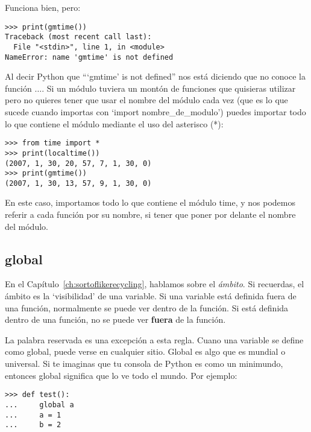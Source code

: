 \begin{listing}
\noindent
Funciona bien, pero:

\begin{listing}
\begin{verbatim}
>>> print(gmtime())
Traceback (most recent call last):
  File "<stdin>", line 1, in <module>
NameError: name 'gmtime' is not defined
\end{verbatim}
\end{listing}

Al decir Python que ```gmtime' is not defined'' nos está diciendo que no conoce la función $\ldots$. Si un módulo tuviera un montón de funciones que quisieras utilizar pero no quieres tener que usar el nombre del módulo cada vez (que es lo que sucede cuando importas con `import nombre\_de\_modulo') puedes importar todo lo que contiene el módulo mediante el uso del asterisco (*):

\begin{listingignore}
\begin{verbatim}
>>> from time import *
>>> print(localtime())
(2007, 1, 30, 20, 57, 7, 1, 30, 0)
>>> print(gmtime())
(2007, 1, 30, 13, 57, 9, 1, 30, 0)
\end{verbatim}
\end{listingignore}

En este caso, importamos todo lo que contiene el módulo time, y nos podemos referir a cada función por su nombre, si tener que poner por delante el nombre del módulo.

\subsection*{global}

En el Capítulo~\ref{ch:sortoflikerecycling}, hablamos sobre el \emph{ámbito}.  Si recuerdas, el ámbito es la `visibilidad' de una variable. Si una variable está definida fuera de una función, normalmente se puede ver dentro de la función. Si está definida dentro de una función, no se puede ver \textbf{fuera} de la función.
\par
La palabra reservada  es una excepción a esta regla. Cuano una variable se define como global, puede verse en cualquier sitio. Global es algo que es mundial o universal. Si te imaginas que tu consola de Python es como un minimundo, entonces global significa que lo ve todo el mundo.  Por ejemplo:

\begin{listing}
\begin{verbatim}
>>> def test():
...     global a
...     a = 1
...     b = 2
\end{verbatim}
\end{listing}


\end{listing}
